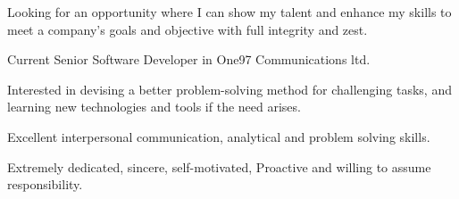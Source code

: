 


\begin{cventries}

  \cventry
    {} %
    {} %
    {} %
    {} %
    {   Looking for an opportunity where I can show my talent and enhance my skills to meet a company’s goals and objective with full integrity and zest. }

\end{cventries}





\begin{cventries}

  \cventry
    {Current  Senior Software Developer in One97 Communications ltd.} %
    {} %
    {} %
    {} %
    {
      \begin{cvitems} %
        \item {Interested in devising a better problem-solving method for challenging tasks, and learning new technologies and tools if the need arises.}
        \item {Excellent interpersonal communication, analytical and problem solving skills.}
        \item {Extremely dedicated, sincere, self-motivated, Proactive and willing to assume responsibility.} 
      \end{cvitems}
    }
\end{cventries}




